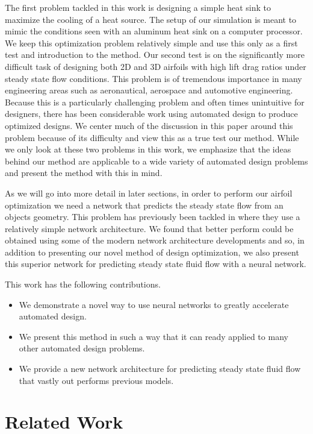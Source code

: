 \documentclass{article} %
\begin{document}
The first problem tackled in this work is designing a simple heat sink to maximize the cooling of a heat source. The setup of our simulation is meant to mimic the conditions seen with an aluminum heat sink on a computer processor. We keep this optimization problem relatively simple and use this only as a first test and introduction to the method. Our second test is on the significantly more difficult task of designing both 2D and 3D airfoils with high lift drag ratios under steady state flow conditions. This problem is of tremendous importance in many engineering areas such as aeronautical, aerospace and automotive engineering. Because this is a particularly challenging problem and often times unintuitive for designers, there has been considerable work using automated design to produce optimized designs. We center much of the discussion in this paper around this problem because of its difficulty and view this as a true test our method. While we only look at these two problems in this work, we emphasize that the ideas behind our method are applicable to a wide variety of automated design problems and present the method with this in mind.

As we will go into more detail in later sections, in order to perform our airfoil optimization we need a network that predicts the steady state flow from an objects geometry. This problem has previously been tackled in \citep{guo2016convolutional} where they use a relatively simple network architecture. We found that better perform could be obtained using some of the modern network architecture developments and so, in addition to presenting our novel method of design optimization, we also present this superior network for predicting steady state fluid flow with a neural network.

This work has the following contributions.
\begin{itemize}
  \item We demonstrate a novel way to use neural networks to greatly accelerate automated design.
  \item We present this method in such a way that it can ready applied to many other automated design problems.
  \item We provide a new network architecture for predicting steady state fluid flow that vastly out performs previous models.
\end{itemize}

\section{Related Work}
\end{document}
